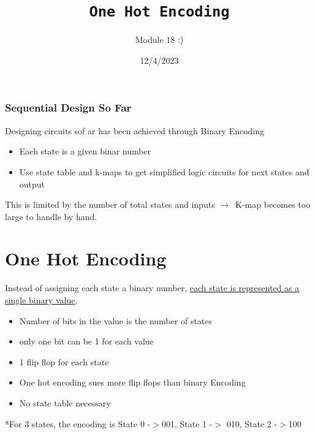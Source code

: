\documentclass[a4paper,12pt]{article}
\title{\texttt{One Hot Encoding}\\\hrulefill}
\author{Module 18 :)}
\date{\small{12/4/2023}}
\newcommand{\ra}{$\rightarrow$}
\begin{document}
    \maketitle

    \subsubsection{Sequential Design So Far}
        Designing circuits sof ar has been achieved through Binary Encoding
        \begin{itemize}
            \item Each state is a given binar number
            \item Use state table and k-maps to get simplified logic circuits for next states and output
        \end{itemize}
        This is limited by the number of total states and inputs \ra~K-map becomes too large to handle by hand. 
    \section{One Hot Encoding}
    Instead of assigning each state a binary number, \underline{each state is represented as a single binary value}.
    \begin{itemize}
        \item Number of bits in the value is the number of states
        \item only one bit can be 1 for each value
        \item 1 flip flop for each state
        \item One hot encoding sues more flip flops than binary Encoding
        \item No state table necessary
    \end{itemize}
    *For 3 states, the encoding is State 0 -$>$001, State 1 -$>$ 010, State 2 -$>$100
\end{document}
